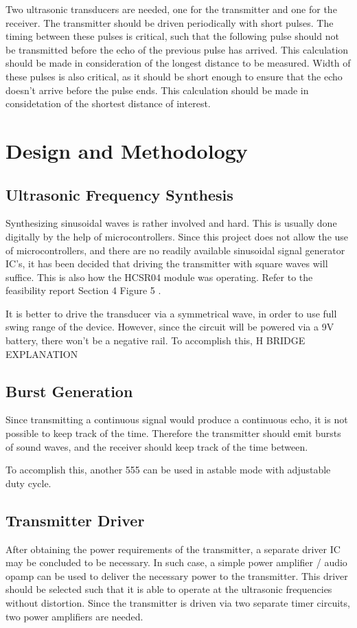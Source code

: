 \documentclass[12pt, a4paper]{article}
\begin{document}
        \bigskip 
        Two ultrasonic transducers are needed, one for the transmitter and one for the receiver. The transmitter should be driven periodically with short pulses. The timing between these pulses is critical, such that the following pulse should not be transmitted before the echo of the previous pulse has arrived. This calculation should be made in consideration of the longest distance to be measured. Width of these pulses is also critical, as it should be short enough to ensure that the echo doesn't arrive before the pulse ends. This calculation should be made in considetation of the shortest distance of interest. 
    

    \pagebreak    
    \section{Design and Methodology}
    	\subsection{Ultrasonic Frequency Synthesis}
	
	Synthesizing sinusoidal waves is rather involved and hard. This is usually done digitally by the help of microcontrollers. Since this project does not allow the use of microcontrollers, and there are no readily available sinusoidal signal generator IC’s, it has been decided that driving the transmitter with square waves will suffice. This is also how the HCSR04 module was operating. Refer to the feasibility report Section 4 Figure 5 .
	
	\bigskip
	It is better to drive the transducer via a symmetrical wave, in order to use full swing range of the device. However, since the circuit will be powered via a 9V battery, there won’t be a negative rail. To accomplish this, H BRIDGE EXPLANATION
	
	\subsection{Burst Generation}
	Since transmitting a continuous signal would produce a continuous echo, it is not possible to keep track of the time. Therefore the transmitter should emit bursts of sound waves, and the receiver should keep track of the time between.

To accomplish this, another 555 can be used in astable mode with adjustable duty cycle.
	
	\subsection{Transmitter Driver}
	After obtaining the power requirements of the transmitter, a separate driver IC may be concluded to be necessary. In such case, a simple power amplifier / audio opamp can be used to deliver the necessary power to the transmitter. This driver should be selected such that it is able to operate at the ultrasonic frequencies without distortion. Since the transmitter is driven via two separate timer circuits, two power amplifiers are needed. 
	
\end{document}
